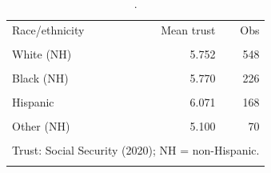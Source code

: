 \begin{table}[htbp]\centering
\caption{.}
\label{tab:trust_mean_by_race_eth_social_security_2020}
\begin{tabular}{lrr}\toprule
Race/ethnicity & Mean trust & Obs \\\\ \midrule
White (NH) & 5.752 & 548 \\\\
Black (NH) & 5.770 & 226 \\\\
Hispanic & 6.071 & 168 \\\\
Other (NH) & 5.100 & 70 \\\\
\bottomrule
\multicolumn{3}{l}{\footnotesize Trust: Social Security (2020); NH = non-Hispanic.} \\\\
\end{tabular}
\end{table}
